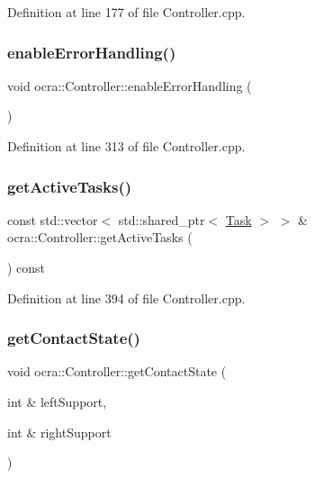 Definition at line 177 of file Controller.\+cpp.

\hypertarget{classocra_1_1Controller_a9f9773f34022d6f7b0abf95255088f70}{}\label{classocra_1_1Controller_a9f9773f34022d6f7b0abf95255088f70} 
\subsubsection{\texorpdfstring{enable\+Error\+Handling()}{enableErrorHandling()}}
{\footnotesize\ttfamily void ocra\+::\+Controller\+::enable\+Error\+Handling (\begin{DoxyParamCaption}{ }\end{DoxyParamCaption})}



Definition at line 313 of file Controller.\+cpp.

\hypertarget{classocra_1_1Controller_a47992af5b31c540f8bd7a828eb768276}{}\label{classocra_1_1Controller_a47992af5b31c540f8bd7a828eb768276} 
\subsubsection{\texorpdfstring{get\+Active\+Tasks()}{getActiveTasks()}}
{\footnotesize\ttfamily const std\+::vector$<$ std\+::shared\+\_\+ptr$<$ \hyperlink{classocra_1_1Task}{Task} $>$ $>$ \& ocra\+::\+Controller\+::get\+Active\+Tasks (\begin{DoxyParamCaption}{ }\end{DoxyParamCaption}) const\hspace{0.3cm}{\ttfamily [protected]}}



Definition at line 394 of file Controller.\+cpp.

\hypertarget{classocra_1_1Controller_a41e0a7fb9fd30c5b58640dd49be10d44}{}\label{classocra_1_1Controller_a41e0a7fb9fd30c5b58640dd49be10d44} 
\subsubsection{\texorpdfstring{get\+Contact\+State()}{getContactState()}}
{\footnotesize\ttfamily void ocra\+::\+Controller\+::get\+Contact\+State (\begin{DoxyParamCaption}\item[{int \&}]{left\+Support,  }\item[{int \&}]{right\+Support }\end{DoxyParamCaption})}




